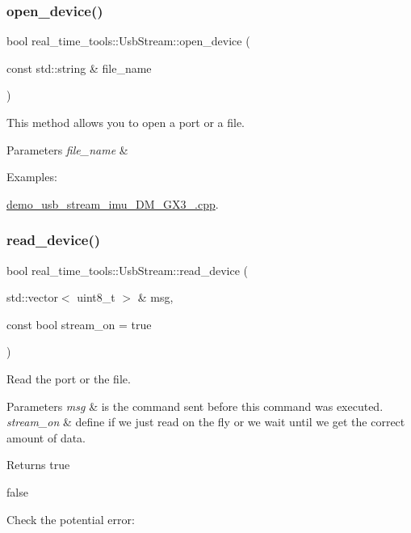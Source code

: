 \subsubsection{\texorpdfstring{open\+\_\+device()}{open\_device()}}
{\footnotesize\ttfamily bool real\+\_\+time\+\_\+tools\+::\+Usb\+Stream\+::open\+\_\+device (\begin{DoxyParamCaption}\item[{const std\+::string \&}]{file\+\_\+name }\end{DoxyParamCaption})}



This method allows you to open a port or a file. 


\begin{DoxyParams}{Parameters}
{\em file\+\_\+name} & \\
\hline
\end{DoxyParams}
\begin{Desc}
\item[Examples\+: ]\par
\hyperlink{demo_usb_stream_imu_3DM_GX3_25_8cpp-example}{demo\+\_\+usb\+\_\+stream\+\_\+imu\+\_\+D\+M\+\_\+\+G\+X3\+\_.\+cpp}.\end{Desc}
\mbox{\label{classreal__time__tools_1_1UsbStream_a028f39fcd8c97c49aacf48fdaa8302c8}} 
\subsubsection{\texorpdfstring{read\+\_\+device()}{read\_device()}}
{\footnotesize\ttfamily bool real\+\_\+time\+\_\+tools\+::\+Usb\+Stream\+::read\+\_\+device (\begin{DoxyParamCaption}\item[{std\+::vector$<$ uint8\+\_\+t $>$ \&}]{msg,  }\item[{const bool}]{stream\+\_\+on = {\ttfamily true} }\end{DoxyParamCaption})}



Read the port or the file. 


\begin{DoxyParams}{Parameters}
{\em msg} & is the command sent before this command was executed. \\
\hline
{\em stream\+\_\+on} & define if we just read on the fly or we wait until we get the correct amount of data. \\
\hline
\end{DoxyParams}
\begin{DoxyReturn}{Returns}
true 

false 
\end{DoxyReturn}
Check the potential error\+:



